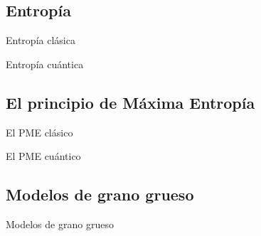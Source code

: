 \subsection{Entropía}
\begin{frame}{Entropía clásica}
    \lipsum[1]
\end{frame}

\begin{frame}{Entropía cuántica}
    \lipsum[1]
\end{frame}

\subsection{El principio de Máxima Entropía}

\begin{frame}{El PME clásico}
    \lipsum[1]
\end{frame}

\begin{frame}{El PME cuántico}
    \lipsum[1]
\end{frame}

\subsection{Modelos de grano grueso}

\begin{frame}{Modelos de grano grueso}
    \lipsum[1]
\end{frame}